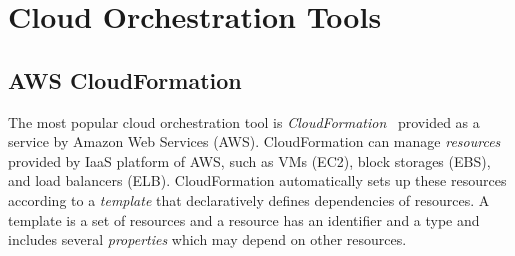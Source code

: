 \documentclass[12pt]{report}
\begin{document}
\chapter{Cloud Orchestration Tools}
\label{chap:cloudorch}

\section{AWS CloudFormation}
\label{sec:aws}
The most popular cloud orchestration tool is {\it
  CloudFormation}~\cite{CloudFormation} provided as a service by
Amazon Web Services (AWS). CloudFormation can manage {\it resources}
provided by IaaS platform of AWS, such as VMs (EC2), block storages
(EBS), and load balancers (ELB).  CloudFormation automatically sets up
these resources according to a {\it template} that declaratively
defines dependencies of resources.  A template is a set of resources
and a resource has an identifier and a type and includes several {\it
  properties} which may depend on other resources.
\end{document}
